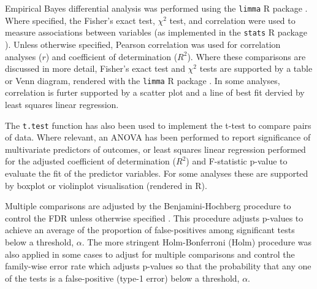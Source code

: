 Empirical Bayes differential  analysis was performed using the \texttt{limma} R package \citep{limma}. Where specified, the Fisher's exact test, $\chi^2$ test, and correlation were used to measure associations between variables (as implemented in the \texttt{stats} R package \citep{R_core}). Unless otherwise specified, Pearson correlation was used for correlation analyses ($r$) and coefficient of determination ($R^2$). Where these comparisons are discussed in more detail, Fisher's exact test and $\chi^2$ tests are supported by a table or Venn diagram, rendered with the \texttt{limma} R package \citep{limma}. In some analyses, correlation is furter supported by a scatter plot and a line of best fit dervied by least squares linear regression. 

The \texttt{t.test} function \citep{R_core} has also been used to implement the t-test to compare pairs of data. Where relevant, an \gls{ANOVA} has been performed to report significance of multivariate predictors of outcomes, or least squares linear regression performed for the adjusted coefficient of determination ($R^2$) and F-statistic p-value to evaluate the fit of the predictor variables. For some analyses these are supported by boxplot or violinplot visualisation (rendered in R).

Multiple comparisons are adjusted by the Benjamini-Hochberg procedure to control the \gls{FDR} unless otherwise specified \citep{fdr1995}. This procedure adjusts p-values to achieve an average of the proportion of false-positives among significant tests below a threshold, $\alpha$. The more stringent Holm-Bonferroni (Holm) procedure \citep{Holm1979} was also applied in some cases to adjust for multiple comparisons and control the family-wise error rate which adjusts p-values so that the probability that any one of the tests is a false-positive (type-1 error) below a threshold, $\alpha$.

